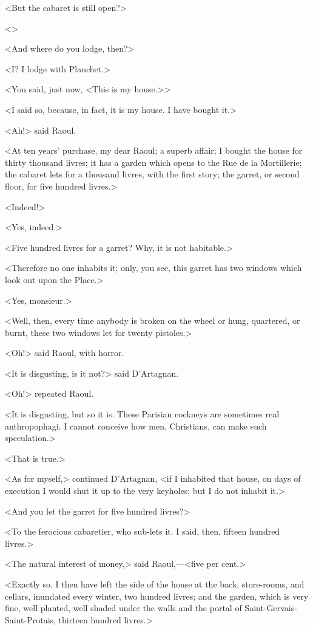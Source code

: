 <But the cabaret is still open?>

<>

<And where do you lodge, then?>

<I\@? I lodge with Planchet.>

<You said, just now, <This is my house.>>

<I said so, because, in fact, it is my house. I have bought it.>

<Ah!> said Raoul.

<At ten years' purchase, my dear Raoul; a superb affair; I bought the house for thirty thousand livres; it has a garden which opens to the Rue de la Mortillerie; the cabaret lets for a thousand livres, with the first story; the garret, or second floor, for five hundred livres.>

<Indeed!>

<Yes, indeed.>

<Five hundred livres for a garret? Why, it is not habitable.>

<Therefore no one inhabits it; only, you see, this garret has two windows which look out upon the Place.>

<Yes, monsieur.>

<Well, then, every time anybody is broken on the wheel or hung, quartered, or burnt, these two windows let for twenty pistoles.>

<Oh!> said Raoul, with horror.

<It is disgusting, is it not?> said D'Artagnan.

<Oh!> repeated Raoul.

<It is disgusting, but so it is. These Parisian cockneys are sometimes real anthropophagi. I cannot conceive how men, Christians, can make such speculation.>

<That is true.>

<As for myself,> continued D'Artagnan, <if I inhabited that house, on days of execution I would shut it up to the very keyholes; but I do not inhabit it.>

<And you let the garret for five hundred livres?>

<To the ferocious cabaretier, who sub-lets it. I said, then, fifteen hundred livres.>

<The natural interest of money,> said Raoul,—<five per cent.>

<Exactly so. I then have left the side of the house at the back, store-rooms, and cellars, inundated every winter, two hundred livres; and the garden, which is very fine, well planted, well shaded under the walls and the portal of Saint-Gervais-Saint-Protais, thirteen hundred livres.>

